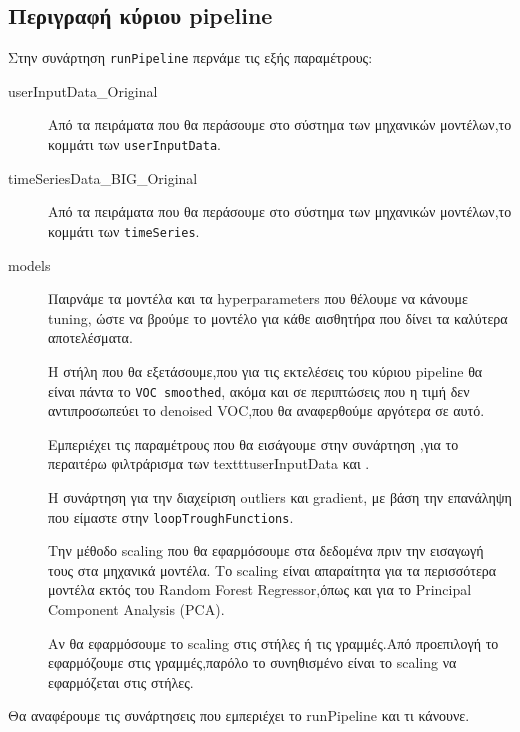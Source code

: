 \subsection{Περιγραφή κύριου pipeline}


Στην συνάρτηση \texttt{runPipeline} περνάμε τις εξής παραμέτρους:


\begin{description}
    \item[userInputData\_Original] Από τα πειράματα που θα περάσουμε στο σύστημα των μηχανικών μοντέλων,το κομμάτι των \texttt{userInputData}.
    \item[timeSeriesData\_BIG\_Original] Από τα πειράματα που θα περάσουμε στο σύστημα των μηχανικών μοντέλων,το κομμάτι των \texttt{timeSeries}.
    \item[models] Παιρνάμε τα μοντέλα και τα hyperparameters που θέλουμε να κάνουμε tuning,
    ώστε να βρούμε το μοντέλο για κάθε αισθητήρα που δίνει τα καλύτερα αποτελέσματα.
    \item[] Η στήλη που θα εξετάσουμε,που για τις εκτελέσεις του κύριου pipeline θα είναι πάντα το \texttt{VOC smoothed},
    ακόμα και σε περιπτώσεις που η τιμή δεν αντιπροσωπεύει το denoised VOC,που θα αναφερθούμε αργότερα σε αυτό.
    \item[] Εμπεριέχει τις παραμέτρους που θα εισάγουμε στην συνάρτηση \linebreak \texttt{},για το περαιτέρω φιλτράρισμα των texttt{userInputData} και \linebreak \texttt{}.
    \item[] Η συνάρτηση για την διαχείριση outliers και gradient, με βάση την επανάληψη που είμαστε στην \texttt{loopTroughFunctions}.
    \item[] Την μέθοδο scaling που θα εφαρμόσουμε στα δεδομένα πριν την εισαγωγή τους στα μηχανικά μοντέλα.
    Το scaling είναι απαραίτητα για τα περισσότερα μοντέλα εκτός του Random Forest Regressor,όπως και για το Principal Component Analysis (PCA).
    \item[] Αν θα εφαρμόσουμε το scaling στις στήλες ή τις γραμμές.Από προεπιλογή το εφαρμόζουμε στις γραμμές,παρόλο το συνηθισμένο είναι το scaling να εφαρμόζεται στις στήλες. 
\end{description}

Θα αναφέρουμε τις συνάρτησεις που εμπεριέχει το runPipeline και τι κάνουνε.

